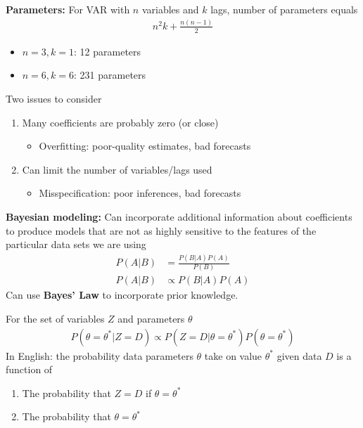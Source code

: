 \documentclass{beamer}
\begin{document}
\begin{frame}
 \textbf{Parameters:} For VAR with $n$ variables and $k$ lags, number of parameters equals
 \begin{align}
   n^2k + \frac{n(n-1)}{2} 
 \end{align}
 \begin{itemize}
   \item $n=3,k=1$: 12 parameters
   \item $n=6,k=6$: 231 parameters
 \end{itemize}
 \medskip
 Two issues to consider
 \begin{enumerate}
   \item Many coefficients are probably zero (or close)
   \begin{itemize}
     \item Overfitting: poor-quality estimates, bad forecasts
   \end{itemize}
   \item Can limit the number of variables/lags used
   \begin{itemize}
      \item Misspecification: poor inferences, bad forecasts
    \end{itemize} 
 \end{enumerate}
\end{frame}

\begin{frame}
  \textbf{Bayesian modeling:} Can incorporate additional information about coefficients to produce models that are not as highly sensitive to the features of the particular data sets we are using   
  \begin{align}
    P(A|B) &= \frac{P(B|A)P(A)}{P(B)}\\
    P(A|B)&\propto P(B|A)P(A)
  \end{align}
  \medskip
  Can use \textbf{Bayes' Law} to incorporate prior knowledge.
\end{frame}

\begin{frame}
 For the set of variables $Z$ and parameters $\theta$
\begin{align}
  P(\theta= \theta^* | Z=D) \propto P(Z=D | \theta =\theta^*)P(\theta= \theta^*)  
\end{align}
\medskip
In English: the probability data parameters $\theta$ take on value $\theta^*$ given data $D$ is a function of
\begin{enumerate}
  \item The probability that $Z=D$ if $\theta= \theta^*$
  \item The probability that $\theta = \theta^*$
\end{enumerate}
\end{frame}
\end{document}

